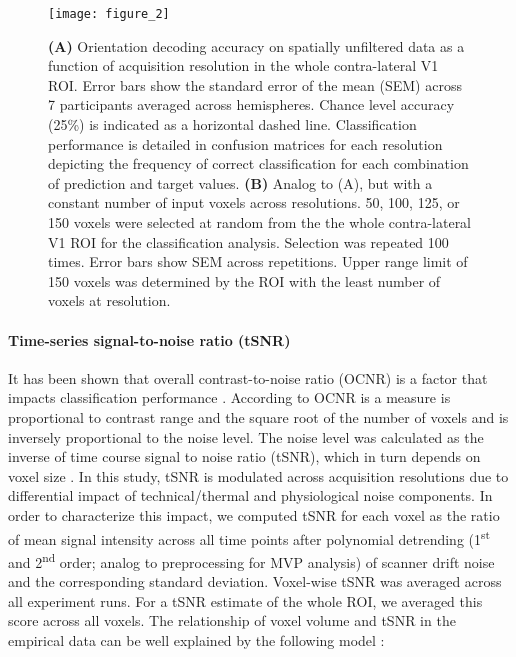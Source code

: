 \begin{figure}
  \centering
  \texttt{[image: figure\_2]}
  \caption{%
    \textbf{(A)} Orientation decoding accuracy on spatially unfiltered data as
    a function of acquisition resolution in the whole contra-lateral V1 ROI.
    Error bars show the standard error of the mean (SEM) across 7 participants
    averaged across hemispheres. Chance level accuracy (25\%) is indicated
    as a horizontal dashed line. Classification performance is detailed in
    confusion matrices for each resolution depicting the frequency of correct 
    classification for each combination of prediction and target values.
    \textbf{(B)} Analog to (A), but with a constant number of input voxels across
    resolutions. 50, 100, 125, or 150 voxels were selected at random from the
    the whole contra-lateral V1 ROI for the classification analysis. Selection was repeated
    100 times. Error bars show SEM across repetitions. Upper range limit of 150
    voxels was determined by the ROI with the least number of voxels at  resolution.
    }

    \label{fig:accbyvxsizeandnumber}
\end{figure}


\paragraph*{Time-series signal-to-noise ratio (tSNR)}

It has been shown that overall contrast-to-noise ratio (OCNR) is a factor that
impacts classification performance \citep{chaimow_2011}. According to 
\citet{chaimow_2011} OCNR is a measure is proportional to contrast range and
the square root of the number of voxels and is inversely proportional to 
the noise level. The noise level was calculated as the inverse of 
time course signal to noise ratio (tSNR), which in turn depends on voxel size \citep{triantafyllou_2005}. 
In this study, tSNR is modulated across acquisition resolutions due to differential
impact of technical/thermal and physiological noise components. In order to
characterize this impact, we computed tSNR for each voxel as the ratio of mean
signal intensity across all time points after polynomial detrending
(1\textsuperscript{st} and 2\textsuperscript{nd} order; analog to preprocessing
for MVP analysis) of scanner drift noise and the corresponding standard
deviation. Voxel-wise tSNR was averaged across all experiment runs. For a tSNR
estimate of the whole ROI, we averaged this score across all voxels. The
relationship of voxel volume and tSNR in the empirical data can be well
explained by the following model \citep{triantafyllou_2005}:

